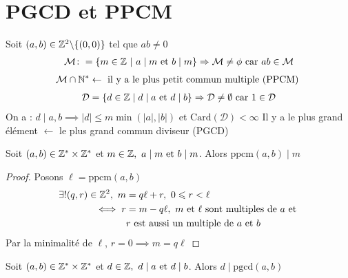 \section{PGCD et PPCM}
\begin{graybox}
\begin{definition}
Soit $(a, b) \in \mathbb{Z}^2 \backslash \{(0, 0)\}$ tel que $ab \neq 0$
\begin{align*}
\mathcal{M} \colon = \left\{ m \in \mathbb{Z} \ | \ a \mid m \text{ et } b \mid m \right\} \Rightarrow \mathcal{M} \neq \phi \text{ car } ab \in \mathcal{M}
\end{align*}
\begin{align*}
\mathcal{M} \cap \mathbb{N}^* \leftarrow \text{ il y a le plus petit commun multiple (PPCM) }
\end{align*}
\begin{align*}
\mathcal{D} = \left\{ d \in \mathbb{Z} \mid d \mid a \text{ et } d \mid b \right\} \Rightarrow \mathcal{D} \neq \emptyset \text{ car } 1 \in \mathcal{D}
\end{align*}
On a : $d \mid a, b \implies |d| \leq m \min (|a|, |b|)$ et $\mathrm{Card}(\mathcal{D}) < \infty$
Il y a le plus grand élément $\leftarrow$ le plus grand commun diviseur (PGCD)
\end{definition}
\end{graybox}

\begin{graybox}
\begin{theoreme}[PPCM]
Soit $(a, b) \in \mathbb{Z}^* \times \mathbb{Z}^*$ et $m \in \mathbb{Z},\ a \mid m \text{ et } b \mid m$. Alors $\mathrm{ppcm}(a, b) \mid m$
\end{theoreme}
\end{graybox}

\begin{proof}
Posons $\ell = \mathrm{ppcm}(a, b)$
\begin{align*}
\exists ! (q, r) \in \mathbb{Z}^2, \ m &= q\ell + r,\ 0 \leqslant r < \ell \\
\iff r &= m - q\ell,\ m \text{ et } \ell \text{ sont multiples de } a \text{ et } 
\\
&r \text{ est aussi un multiple de } a \text{ et } b
\end{align*}
Par la minimalité de $\ell$, $r = 0 \implies m = q \ell$
\end{proof}

\begin{graybox}
\begin{theoreme}[PGCD]
Soit $(a, b) \in \mathbb{Z}^* \times \mathbb{Z}^*$ et $d \in \mathbb{Z},\ d \mid a \text{ et } d \mid b$. Alors $d \mid \mathrm{pgcd}(a, b)$
\end{theoreme}
\end{graybox}

